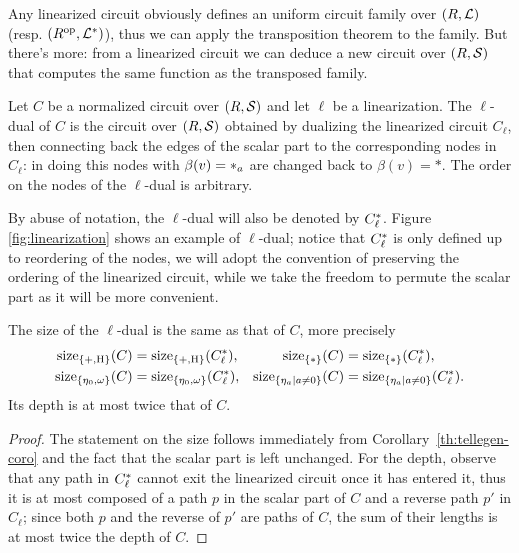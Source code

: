 Any linearized circuit obviously defines an uniform circuit family
over $(R,\mathcal{L})$ (resp. $(R^{\mathrm{op}},\mathcal{L}^\ast)$), thus we can apply
the transposition theorem to the family. But there's more: from a
linearized circuit we can deduce a new circuit over $(R,\mathcal{S})$ that
computes the same function as the transposed family.

\begin{definition}
  \label{def:ell-dual}
  Let $C$ be a normalized circuit over $(R,\mathcal{S})$ and let $\ell$ be
  a linearization.  The $\ell$-dual of $C$ is the circuit over
  $(R,\mathcal{S})$ obtained by dualizing the linearized circuit $C_\ell$,
  then connecting back the edges of the scalar part to the
  corresponding nodes in $C_\ell$: in doing this nodes with
  $\beta(v)=*_{a}$ are changed back to $\beta(v)=*$. The order on
  the nodes of the $\ell$-dual is arbitrary.
\end{definition}

By abuse of notation, the $\ell$-dual will also be denoted by
$C_\ell^\ast$. Figure \ref{fig:linearization} shows an example of
$\ell$-dual; notice that $C_\ell^\ast$ is only defined up to
reordering of the nodes, we will adopt the convention of preserving
the ordering of the linearized circuit, while we take the freedom to
permute the scalar part as it will be more convenient.

\begin{proposition}
  \label{th:tellegen-multi}
  The size of the $\ell$-dual is the same as that of $C$, more
  precisely
  \begin{align*}
    \operatorname{size}_{\{+,\operatorname{H}\}}(C) &= \operatorname{size}_{\{+,\operatorname{H}\}}(C_\ell^\ast), 
    &\operatorname{size}_{\{*\}}(C) &= \operatorname{size}_{\{*\}}(C_\ell^\ast),\\
    \operatorname{size}_{\{\eta_0,\omega\}}(C) &= \operatorname{size}_{\{\eta_0,\omega\}}(C_\ell^\ast), 
    &\operatorname{size}_{\{\eta_a|a\ne0\}}(C) &= \operatorname{size}_{\{\eta_a|a\ne0\}}(C_\ell^\ast).
  \end{align*}
  Its depth is at most twice that of $C$.
\end{proposition}
\begin{proof}
    The statement on the size follows
  immediately from Corollary~\ref{th:tellegen-coro} and the fact that
  the scalar part is left unchanged. For the depth, observe that any
  path in $C_\ell^\ast$ cannot exit the linearized circuit once it
  has entered it, thus it is at most composed of a path $p$ in the
  scalar part of $C$ and a reverse path $p'$ in $C_\ell$; since both
  $p$ and the reverse of $p'$ are paths of $C$, the sum of their
  lengths is at most twice the depth of $C$.
\end{proof}


